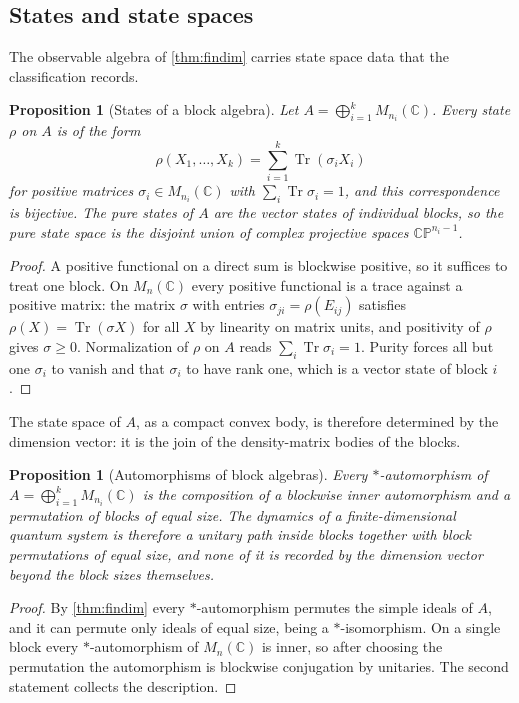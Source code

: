 \documentclass[11pt,letterpaper]{article}
\newtheorem{proposition}[theorem]{Proposition}
\theoremstyle{definition}
\theoremstyle{remark}
\begin{document}
\subsection{States and state spaces}

The observable algebra of \cref{thm:findim} carries state space data that the classification records.

\begin{proposition}[States of a block algebra]
\label{prop:states}
Let $A = \bigoplus_{i=1}^{k} M_{n_i}(\mathbb{C})$. Every state $\rho$ on $A$ is of the form
\[
\rho(X_1, \dots, X_k) = \sum_{i=1}^{k} \operatorname{Tr}(\sigma_i X_i)
\]
for positive matrices $\sigma_i \in M_{n_i}(\mathbb{C})$ with $\sum_i \operatorname{Tr} \sigma_i = 1$, and this correspondence is bijective. The pure states of $A$ are the vector states of individual blocks, so the pure state space is the disjoint union of complex projective spaces $\mathbb{CP}^{n_i - 1}$.
\end{proposition}

\begin{proof}
A positive functional on a direct sum is blockwise positive, so it suffices to treat one block. On $M_n(\mathbb{C})$ every positive functional is a trace against a positive matrix: the matrix $\sigma$ with entries $\sigma_{ji} = \rho(E_{ij})$ satisfies $\rho(X) = \operatorname{Tr}(\sigma X)$ for all $X$ by linearity on matrix units, and positivity of $\rho$ gives $\sigma \geq 0$. Normalization of $\rho$ on $A$ reads $\sum_i \operatorname{Tr} \sigma_i = 1$. Purity forces all but one $\sigma_i$ to vanish and that $\sigma_i$ to have rank one, which is a vector state of block $i$.
\end{proof}

The state space of $A$, as a compact convex body, is therefore determined by the dimension vector: it is the join of the density-matrix bodies of the blocks.

\begin{proposition}[Automorphisms of block algebras]
\label{prop:aut}
Every $*$-automorphism of $A = \bigoplus_{i=1}^{k} M_{n_i}(\mathbb{C})$ is the composition of a blockwise inner automorphism and a permutation of blocks of equal size. The dynamics of a finite-dimensional quantum system is therefore a unitary path inside blocks together with block permutations of equal size, and none of it is recorded by the dimension vector beyond the block sizes themselves.
\end{proposition}

\begin{proof}
By \cref{thm:findim} every $*$-automorphism permutes the simple ideals of $A$, and it can permute only ideals of equal size, being a $*$-isomorphism. On a single block every $*$-automorphism of $M_n(\mathbb{C})$ is inner, so after choosing the permutation the automorphism is blockwise conjugation by unitaries. The second statement collects the description.
\end{proof}
\end{document}
